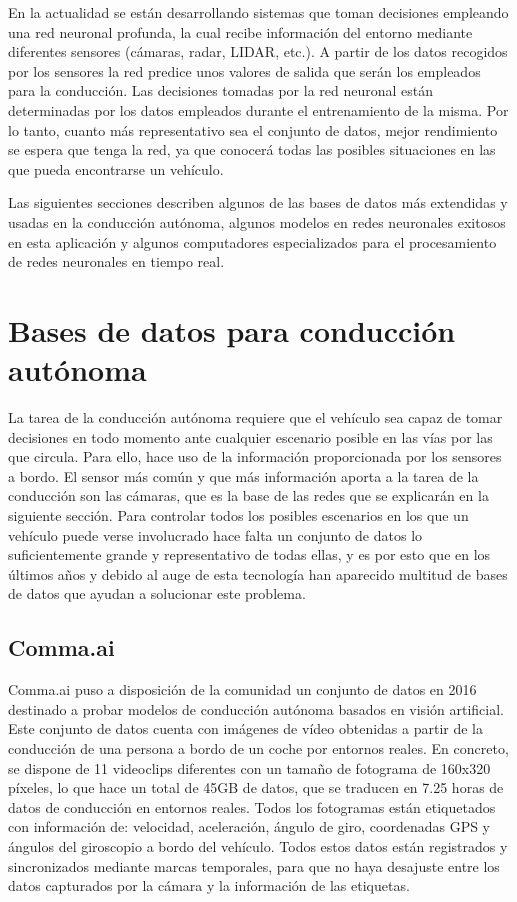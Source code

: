 En la actualidad se están desarrollando sistemas que toman decisiones empleando una red neuronal profunda, la cual recibe información del entorno mediante diferentes sensores (cámaras, radar, LIDAR, etc.). A partir de los datos recogidos por los sensores la red predice unos valores de salida que serán los empleados para la conducción. Las decisiones tomadas por la red neuronal están determinadas por los datos empleados durante el entrenamiento de la misma. Por lo tanto, cuanto más representativo sea el conjunto de datos, mejor rendimiento se espera que tenga la red, ya que conocerá todas las posibles situaciones en las que pueda encontrarse un vehículo.

Las siguientes secciones describen algunos de las bases de datos más extendidas y usadas en la conducción autónoma, algunos modelos en redes neuronales exitosos en esta aplicación y algunos computadores especializados para el procesamiento de redes neuronales en tiempo real.

\section{Bases de datos para conducción autónoma}
\label{sec:datasets}

La tarea de la conducción autónoma requiere que el vehículo sea capaz de tomar decisiones en todo momento ante cualquier escenario posible en las vías por las que circula. Para ello, hace uso de la información proporcionada por los sensores a bordo. El sensor más común y que más información aporta a la tarea de la conducción son las cámaras, que es la base de las redes que se explicarán en la siguiente sección. Para controlar todos los posibles escenarios en los que un vehículo puede verse involucrado hace falta un conjunto de datos lo suficientemente grande y representativo de todas ellas, y es por esto que en los últimos años y debido al auge de esta tecnología han aparecido multitud de bases de datos que ayudan a solucionar este problema.
    
\subsection{Comma.ai}

Comma.ai puso a disposición de la comunidad un conjunto de datos en 2016 \cite{comma} destinado a probar modelos de conducción autónoma basados en visión artificial. Este conjunto de datos cuenta con imágenes de vídeo obtenidas a partir de la conducción de una persona a bordo de un coche por entornos reales. En concreto, se dispone de 11 videoclips diferentes con un tamaño de fotograma de 160x320 píxeles, lo que hace un total de 45GB de datos, que se traducen en 7.25 horas de datos de conducción en entornos reales. Todos los fotogramas están etiquetados con información de: velocidad, aceleración, ángulo de giro, coordenadas GPS y ángulos del giroscopio a bordo del vehículo. Todos estos datos están registrados y sincronizados mediante marcas temporales, para que no haya desajuste entre los datos capturados por la cámara y la información de las etiquetas.


